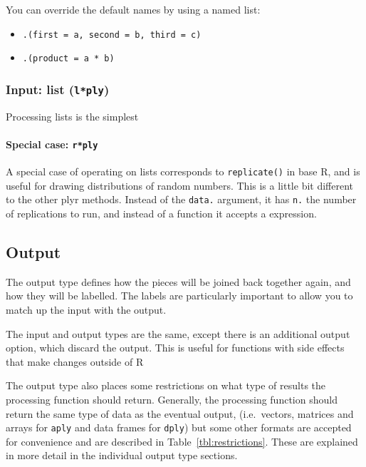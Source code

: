 \documentclass[letterpage]{scrartcl}
\newcommand{\code}[1]{\lstinline!#1!}
\newcommand{\f}[1]{\lstinline!#1()!}
\begin{document}
You can override the default names by using a named list:
\begin{itemize}
  \item \code{.(first = a, second = b, third = c)}
  \item \code{.(product = a * b)}
\end{itemize}

\subsubsection{Input: list (\code{l*ply})} 

Processing lists is the simplest   

\paragraph{Special case: \code{r*ply}}  A special case of operating on lists corresponds to \f{replicate} in base R, and is useful for drawing distributions of random numbers.  This is a little bit different to the other plyr methods.  Instead of the \code{data.} argument, it has \code{n.} the number of replications to run, and instead of a function it accepts a expression.  

\subsection{Output}
\label{sec:output}

The output type defines how the pieces will be joined back together again, and how they will be labelled.  The labels are particularly important to allow you to match up the input with the output.

The input and output types are the same, except there is an additional output option, which discard the output.  This is useful for functions with side effects that make changes outside of R

The output type also places some restrictions on what type of results the processing function should return.  Generally, the processing function should return the same type of data as the eventual output, (i.e.\ vectors, matrices and arrays for {\tt *aply} and data frames for {\tt *dply}) but some other formats are accepted for convenience and are described in Table~\ref{tbl:restrictions}.  These are explained in more detail in the individual output type sections.
\end{document}
